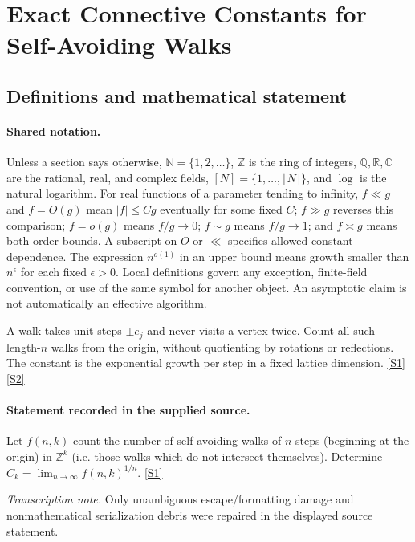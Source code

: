 \documentclass[11pt,a4paper]{article}
\newcommand{\N}{\mathbb{N}}
\newcommand{\Z}{\mathbb{Z}}
\newcommand{\Q}{\mathbb{Q}}
\newcommand{\R}{\mathbb{R}}
\newcommand{\C}{\mathbb{C}}
\newcommand{\sref}[2]{\hyperlink{source:#1:#2}{[S#2]}}
\begin{document}
\section{Exact Connective Constants for Self-Avoiding Walks}\label{statement}


\subsection{Definitions and mathematical statement}

\paragraph{Shared notation.}Unless a section says otherwise, $\N=\{1,2,\ldots\}$,
$\Z$ is the ring of integers, $\Q,\R,\C$ are the rational, real, and complex
fields, $[N]=\{1,\ldots,\lfloor N\rfloor\}$, and $\log$ is the natural
logarithm. For real functions of a parameter tending to infinity,
$f\ll g$ and $f=O(g)$ mean $|f|\leq Cg$ eventually for some fixed $C$;
$f\gg g$ reverses this comparison; $f=o(g)$ means $f/g\to0$;
$f\sim g$ means $f/g\to1$; and $f\asymp g$ means both order bounds.
A subscript on $O$ or $\ll$ specifies allowed constant dependence.
The expression $n^{o(1)}$ in an upper bound means growth smaller than
$n^\epsilon$ for each fixed $\epsilon>0$. Local definitions govern any
exception, finite-field convention, or use of the same symbol for another
object. An asymptotic claim is not automatically an effective algorithm.



A walk takes unit steps $\pm e_j$ and never visits a vertex twice. Count all such length-$n$ walks from the origin, without quotienting by rotations or reflections. The constant is the exponential growth per step in a fixed lattice dimension. \sref{statement}{1} \sref{statement}{2}

\paragraph{Statement recorded in the supplied source.}
Let $f(n,k)$ count the number of self-avoiding walks of $n$ steps (beginning at the origin) in $\mathbb{Z}^k$ (i.e. those walks which do not intersect themselves). Determine $ C_k=\lim_{n\to\infty}f(n,k)^{1/n}. $ \sref{statement}{1}

{\small\emph{Transcription note.} Only unambiguous escape/formatting damage and nonmathematical serialization debris were repaired in the displayed source statement.}
\end{document}
